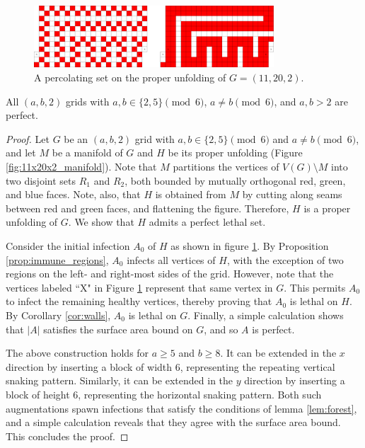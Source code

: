\begin{figure}[]
\centering
\includegraphics[width=0.8\textwidth]{figures/7/11x20x2_unfolded_lethal.pdf}
\caption{A percolating set on the proper unfolding of $G= (11,20,2)$.}
\label{fig:11x20x2_unfolded_lethal}
\end{figure} 

\begin{con}
All $(a,b,2)$ grids with $a,b \in \{2,5\} \pmod 6$, $a \neq b \pmod 6$, and $a,b > 2$ are perfect. 
\end{con}

\begin{proof}
Let $G$ be an $(a,b,2)$ grid with $a,b \in \{2,5\} \pmod 6$ and $a \neq b \pmod 6$, and let $M$ be a manifold of $G$ and $H$ be its proper unfolding (Figure \ref{fig:11x20x2_manifold}). Note that $M$ partitions the vertices of $V(G) \setminus M$ into two disjoint sets $R_1$ and $R_2$, both bounded by mutually orthogonal red, green, and blue faces. Note, also, that $H$ is obtained from $M$ by cutting along seams between red and green faces, and flattening the figure. Therefore, $H$ is a proper unfolding of $G$. We show that $H$ admits a perfect lethal set. 

Consider the initial infection $A_0$ of $H$ as shown in figure \ref{fig:11x20x2_unfolded_lethal}. By Proposition \ref{prop:immune_regions}, $A_0$ infects all vertices of $H$, with the exception of two regions on the left- and right-most sides of the grid. However, note that the vertices labeled ``X" in Figure \ref{fig:11x20x2_unfolded_lethal} represent that same vertex in $G$. This permits $A_0$ to infect the remaining healthy vertices, thereby proving that $A_0$ is lethal on $H$. By Corollary \ref{cor:walls}, $A_0$ is lethal on $G$. Finally, a simple calculation shows that $|A|$ satisfies the surface area bound on $G$, and so $A$ is perfect. 

The above construction holds for $a \geq 5$ and $b \geq 8$. It can be extended in the $x$ direction by inserting a block of width 6, representing the repeating vertical snaking pattern. Similarly, it can be extended in the $y$ direction by inserting a block of height 6, representing the horizontal snaking pattern. Both such augmentations spawn infections that satisfy the conditions of lemma \ref{lem:forest}, and a simple calculation reveals that they agree with the surface area bound. This concludes the proof. 
\end{proof}

